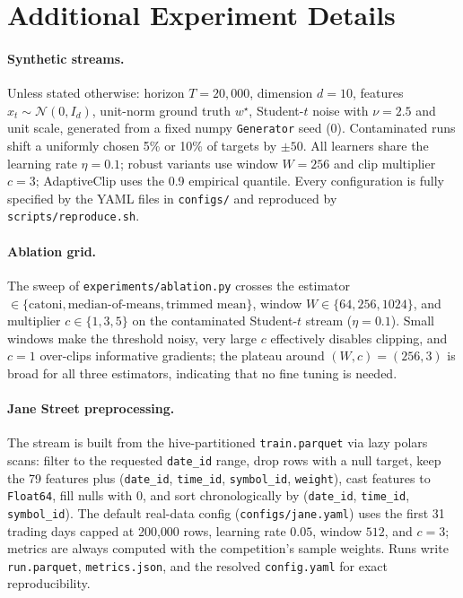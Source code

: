 \section{Additional Experiment Details}
\label{app:experiments}

\paragraph{Synthetic streams.} Unless stated otherwise: horizon $T = 20{,}000$,
dimension $d = 10$, features $x_t \sim \mathcal{N}(0, I_d)$, unit-norm ground truth
$w^\star$, Student-$t$ noise with $\nu = 2.5$ and unit scale, generated from a fixed
numpy \texttt{Generator} seed (0). Contaminated runs shift a uniformly chosen 5\% or
10\% of targets by $\pm 50$. All learners share the learning rate $\eta = 0.1$; robust
variants use window $W = 256$ and clip multiplier $c = 3$; AdaptiveClip uses the 0.9
empirical quantile. Every configuration is fully specified by the YAML files in
\texttt{configs/} and reproduced by \texttt{scripts/reproduce.sh}.

\paragraph{Ablation grid.} The sweep of \texttt{experiments/ablation.py} crosses the
estimator $\in \{\text{catoni}, \text{median-of-means}, \text{trimmed mean}\}$, window
$W \in \{64, 256, 1024\}$, and multiplier $c \in \{1, 3, 5\}$ on the contaminated
Student-$t$ stream ($\eta = 0.1$). Small windows make the threshold noisy, very large
$c$ effectively disables clipping, and $c = 1$ over-clips informative gradients; the
plateau around $(W, c) = (256, 3)$ is broad for all three estimators, indicating that no
fine tuning is needed.

\paragraph{Jane Street preprocessing.} The stream is built from the hive-partitioned
\texttt{train.parquet} via lazy polars scans: filter to the requested \texttt{date\_id}
range, drop rows with a null target, keep the 79 features plus
(\texttt{date\_id}, \texttt{time\_id}, \texttt{symbol\_id}, \texttt{weight}), cast
features to \texttt{Float64}, fill nulls with $0$, and sort chronologically by
(\texttt{date\_id}, \texttt{time\_id}, \texttt{symbol\_id}). The default real-data
config (\texttt{configs/jane.yaml}) uses the first 31 trading days capped at 200{,}000
rows, learning rate $0.05$, window $512$, and $c = 3$; metrics are always computed with
the competition's sample weights. Runs write \texttt{run.parquet},
\texttt{metrics.json}, and the resolved \texttt{config.yaml} for exact reproducibility.
